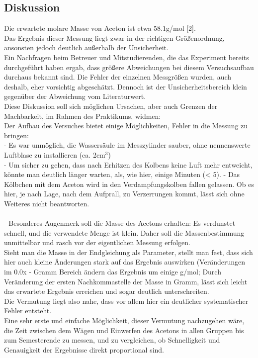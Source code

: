 \documentclass[12pt,a4paper]{article}
\begin{document}
\begin{multicols}{2}
\subsection{Diskussion}
Die erwartete molare Masse von Aceton ist etwa $58.1$g/mol [2].\\
Das Ergebnis dieser Messung liegt zwar in der richtigen Größenordnung, ansonsten jedoch deutlich außerhalb der Unsicherheit.\\
Ein Nachfragen beim Betreuer und Mitstudierenden, die das Experiment bereits durchgeführt haben ergab, dass größere Abweichungen bei diesem Versuchsaufbau durchaus bekannt sind. Die Fehler der einzelnen Messgrößen wurden, auch deshalb, eher vorsichtig abgeschätzt. Dennoch ist der Unsicherheitsbereich klein gegenüber der Abweichung vom Literaturwert.\\
Diese Diskussion soll sich möglichen Ursachen, aber auch Grenzen der Machbarkeit, im Rahmen des Praktikums, widmen:\\
Der Aufbau des Versuches bietet einige Möglichkeiten, Fehler in die Messung zu bringen:\\
\indent - Es war unmöglich, die Wassersäule im Messzylinder sauber, ohne nennenswerte Luftblase zu installieren (ca. 2cm$^3$)\\
\indent - Um sicher zu gehen, dass nach Erhitzen des Kolbens keine Luft mehr entweicht, könnte man deutlich länger warten, als, wie hier, einige Minuten (< 5).
\indent - Das Kölbchen mit dem Aceton wird in den Verdampfungskolben fallen gelassen. Ob es hier, je nach Lage, nach dem Aufprall, zu Verzerrungen kommt, lässt sich ohne Weiteres nicht beantworten.\\
\\
\indent - Besonderes Augenmerk soll die Masse des Acetons erhalten: Es verdunstet schnell, und die verwendete Menge ist klein. Daher soll die Massenbestimmung unmittelbar und rasch vor der eigentlichen Messung erfolgen.\\
Sieht man die Masse in der Endgleichung als Parameter, stellt man fest, dass sich hier auch kleine Änderungen stark auf das Ergebnis auswirken (Veränderungen im 0.0x - Gramm Bereich ändern das Ergebnis um einige g/mol; Durch Veränderung der ersten Nachkommastelle der Masse in Gramm, lässt sich leicht das erwartete Ergebnis erreichen und sogar deutlich unterschreiten.\\
Die Vermutung liegt also nahe, dass vor allem hier ein deutlicher systematischer Fehler entsteht.\\
Eine sehr erste und einfache Möglichkeit, dieser Vermutung nachzugehen wäre, die Zeit zwischen dem Wägen und Einwerfen des Acetons in allen Gruppen bis zum Semesterende zu messen, und zu vergleichen, ob Schnelligkeit und Genauigkeit der Ergebnisse direkt proportional sind.\\

\end{multicols}
\end{document}
